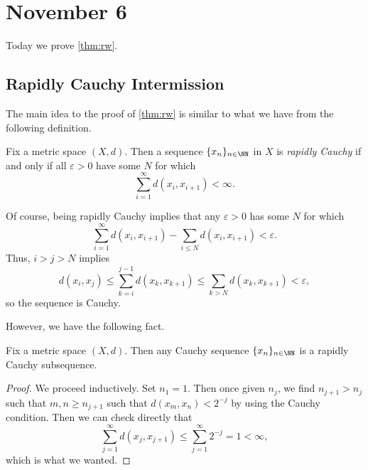 \documentclass[../notes.tex]{subfiles}
\begin{document}
\section{November 6}

Today we prove \autoref{thm:rw}.

\subsection{Rapidly Cauchy Intermission}
The main idea to the proof of \autoref{thm:rw} is similar to what we have from the following definition.
\begin{definition}
	Fix a metric space $(X,d)$. Then a sequence $\{x_n\}_{n\in\NN}$ in $X$ is \textit{rapidly Cauchy} if and only if all $\varepsilon>0$ have some $N$ for which
	\[\sum_{i=1}^\infty d(x_i,x_{i+1})<\infty.\]
\end{definition}
\begin{remark}
	Of course, being rapidly Cauchy implies that any $\varepsilon>0$ has some $N$ for which
	\[\sum_{i=1}^\infty d(x_i,x_{i+1})-\sum_{i\le N}d(x_i,x_{i+1})<\varepsilon.\]
	Thus, $i>j>N$ implies
	\[d(x_i,x_j)\le\sum_{k=i}^{j-1}d(x_k,x_{k+1})\le\sum_{k>N}d(x_k,x_{k+1})<\varepsilon,\]
	so the sequence is Cauchy.
\end{remark}
However, we have the following fact.
\begin{proposition} \label{prop:cauchy-has-rapidly-cauchy}
	Fix a metric space $(X,d)$. Then any Cauchy sequence $\{x_n\}_{n\in\NN}$ is a rapidly Cauchy subsequence.
\end{proposition}
\begin{proof}
	We proceed inductively. Set $n_1=1$. Then once given $n_j$, we find $n_{j+1}>n_j$ such that $m,n\ge n_{j+1}$ such that $d(x_m,x_n)<2^{-j}$ by using the Cauchy condition. Then we can check directly that
	\[\sum_{j=1}^\infty d(x_j,x_{j+1})\le\sum_{j=1}^\infty2^{-j}=1<\infty,\]
	which is what we wanted.
\end{proof}
\end{document}
